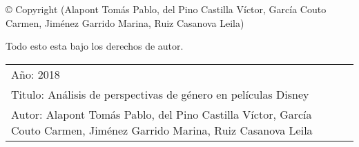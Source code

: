 \newpage
\thispagestyle{empty}
\begin{flushleft} © Copyright (Alapont Tomás Pablo, del Pino Castilla Víctor, García Couto Carmen, Jiménez Garrido Marina, Ruiz Casanova Leila)

Todo esto esta bajo los derechos de autor. 
\vspace{16mm}

\begin{tabular}{@{}lp{\textwidth-10em}}
Año: 2018 \\
Titulo: Análisis de perspectivas de género en películas Disney\\
Autor: Alapont Tomás Pablo, del Pino Castilla Víctor, García Couto Carmen, Jiménez Garrido Marina, Ruiz Casanova Leila\\
\end{tabular}
\end{flushleft}